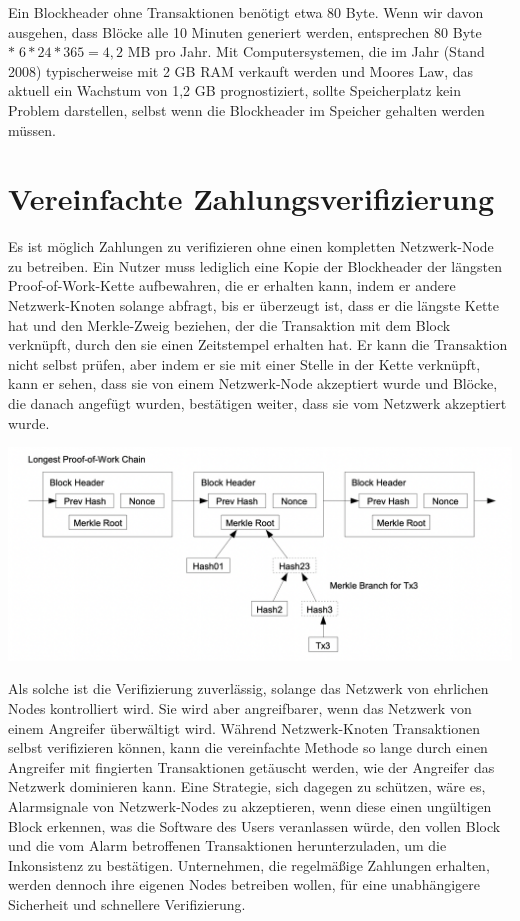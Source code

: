 \documentclass[10pt]{article}
\begin{document}
	Ein Blockheader ohne Transaktionen benötigt etwa 80 Byte. Wenn wir davon ausgehen, dass Blöcke alle 10 Minuten generiert werden, entsprechen 80 Byte $* \;6 * 24 * 365 = 4,2$ MB pro Jahr. Mit Computersystemen, die im Jahr (Stand 2008) typischerweise mit 2 GB RAM verkauft werden und Moores Law, das aktuell ein Wachstum von 1,2 GB prognostiziert, sollte Speicherplatz kein Problem darstellen, selbst wenn die Blockheader im Speicher gehalten werden müssen.
	
	\section{Vereinfachte Zahlungsverifizierung}
	
	Es ist möglich Zahlungen zu verifizieren ohne einen kompletten Netzwerk-Node zu betreiben. Ein Nutzer muss lediglich eine Kopie der Blockheader der längsten Proof-of-Work-Kette aufbewahren, die er erhalten kann, indem er andere Netzwerk-Knoten solange abfragt, bis er überzeugt ist, dass er die längste Kette hat und den Merkle-Zweig beziehen, der die Transaktion mit dem Block verknüpft, durch den sie einen Zeitstempel erhalten hat. Er kann die Transaktion nicht selbst prüfen, aber indem er sie mit einer Stelle in der Kette verknüpft, kann er sehen, dass sie von einem Netzwerk-Node akzeptiert wurde und Blöcke, die danach angefügt wurden, bestätigen weiter, dass sie vom Netzwerk akzeptiert wurde.
	
	\begin{center}
		\includegraphics[scale=0.35]{pics/spv.png}
	\end{center}
	
	Als solche ist die Verifizierung zuverlässig, solange das Netzwerk von ehrlichen Nodes kontrolliert wird. Sie wird aber angreifbarer, wenn das Netzwerk von einem Angreifer überwältigt wird. Während Netzwerk-Knoten Transaktionen selbst verifizieren können, kann die vereinfachte Methode so lange durch einen Angreifer mit fingierten Transaktionen getäuscht werden, wie der Angreifer das Netzwerk dominieren kann. Eine Strategie, sich dagegen zu schützen, wäre es, Alarmsignale von Netzwerk-Nodes zu akzeptieren, wenn diese einen ungültigen Block erkennen, was die Software des Users veranlassen würde, den vollen Block und die vom Alarm betroffenen Transaktionen herunterzuladen, um die Inkonsistenz zu bestätigen. Unternehmen, die regelmäßige Zahlungen erhalten, werden dennoch ihre eigenen Nodes betreiben wollen, für eine unabhängigere Sicherheit und schnellere Verifizierung.
\end{document}
